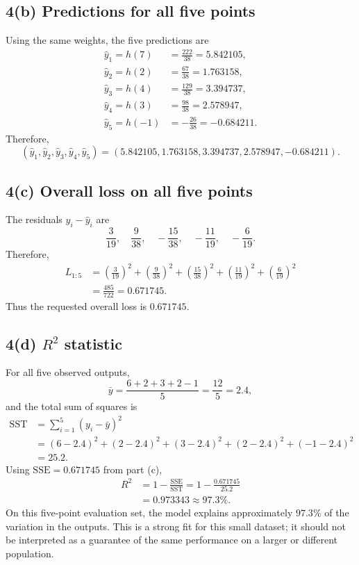 \documentclass[11pt]{article}
\newcommand{\Rtwo}{R^2}
\begin{document}
\subsection*{4(b) Predictions for all five points}
Using the same weights, the five predictions are
\begin{align*}
\widehat y_1=h(7)&=\frac{222}{38}=5.842105,\\
\widehat y_2=h(2)&=\frac{67}{38}=1.763158,\\
\widehat y_3=h(4)&=\frac{129}{38}=3.394737,\\
\widehat y_4=h(3)&=\frac{98}{38}=2.578947,\\
\widehat y_5=h(-1)&=-\frac{26}{38}=-0.684211.
\end{align*}
Therefore,
\[
\boxed{(\widehat y_1,\widehat y_2,\widehat y_3,\widehat y_4,\widehat y_5)
=(5.842105,1.763158,3.394737,2.578947,-0.684211)}.
\]

\subsection*{4(c) Overall loss on all five points}
The residuals $y_i-\widehat y_i$ are
\[
\frac{3}{19},\quad \frac{9}{38},\quad -\frac{15}{38},\quad
-\frac{11}{19},\quad -\frac{6}{19}.
\]
Therefore,
\begin{align*}
L_{1:5}
&=\left(\frac3{19}\right)^2+\left(\frac9{38}\right)^2
 +\left(\frac{15}{38}\right)^2+\left(\frac{11}{19}\right)^2
 +\left(\frac6{19}\right)^2\\
&=\frac{485}{722}=0.671745.
\end{align*}
Thus the requested overall loss is \(\boxed{0.671745}\).

\subsection*{4(d) $R^2$ statistic}
For all five observed outputs,
\[
\bar y=\frac{6+2+3+2-1}{5}=\frac{12}{5}=2.4,
\]
and the total sum of squares is
\begin{align*}
\mathrm{SST}&=\sum_{i=1}^{5}(y_i-\bar y)^2\\
&=(6-2.4)^2+(2-2.4)^2+(3-2.4)^2
 +(2-2.4)^2+(-1-2.4)^2\\
&=25.2.
\end{align*}
Using $\mathrm{SSE}=0.671745$ from part (c),
\begin{align*}
\Rtwo&=1-\frac{\mathrm{SSE}}{\mathrm{SST}}
=1-\frac{0.671745}{25.2}\\
&=\boxed{0.973343}\approx 97.3\%.
\end{align*}
On this five-point evaluation set, the model explains approximately $97.3\%$
of the variation in the outputs.  This is a strong fit for this small dataset;
it should not be interpreted as a guarantee of the same performance on a larger
or different population.
\end{document}
